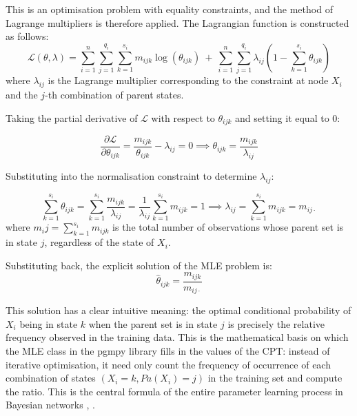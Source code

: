 \vspace{1em}
This is an optimisation problem with equality constraints, and the method of Lagrange multipliers is therefore applied. The Lagrangian function is constructed as follows:
\begin{equation}
    \mathcal{L}(\theta, \lambda) = \sum_{i=1}^{n}\sum_{j=1}^{q_i}\sum_{k=1}^{s_i} m_{ijk}\log(\theta_{ijk})\ +\ \sum_{i=1}^{n}\sum_{j=1}^{q_i} \lambda_{ij}\!\left(1 - \sum_{k=1}^{s_i}\theta_{ijk}\right)
\end{equation}
where $\lambda_{ij}$ is the Lagrange multiplier corresponding to the constraint at node $X_i$ and the $j$-th combination of parent states.

\vspace{1em}
\noindent
Taking the partial derivative of $\mathcal{L}$ with respect to $\theta_{ijk}$ and setting it equal to 0:

\begin{equation}
    \frac{\partial \mathcal{L}}{\partial \theta_{ijk}} = \frac{m_{ijk}}{\theta_{ijk}} - \lambda_{ij} = 0 \implies \theta_{ijk} = \frac{m_{ijk}}{\lambda_{ij}}
\end{equation}

\vspace{1em}
\noindent
Substituting into the normalisation constraint to determine $\lambda_{ij}$:

\begin{equation}
    \sum_{k=1}^{s_i}\theta_{ijk} = \sum_{k=1}^{s_i}\frac{m_{ijk}}{\lambda_{ij}} = \frac{1}{\lambda_{ij}}\sum_{k=1}^{s_i}m_{ijk} = 1 \implies \lambda_{ij} = \sum_{k=1}^{s_i}m_{ijk} = m_{ij\cdot}
\end{equation}
where $m_ij = \sum_{k=1}^{s_i}m_{ijk}$ is the total number of observations whose parent set is in state $j$, regardless of the state of $X_i$.

\vspace{1em}
\noindent
Substituting back, the explicit solution of the MLE problem is:
\begin{equation}
    \boxed{\hat{\theta}_{ijk} = \frac{m_{ijk}}{m_{ij\cdot}}}
\end{equation}

\vspace{1em}
This solution has a clear intuitive meaning: the optimal conditional probability of $X_i$ being in state $k$ when the parent set is in state $j$ is precisely the relative frequency observed in the training data. This is the mathematical basis on which the MLE class in the pgmpy library fills in the values of the CPT: instead of iterative optimisation, it need only count the frequency of occurrence of each combination of states $(X_i = k, Pa(X_i) = j)$ in the training set and compute the ratio. This is the central formula of the entire parameter learning process in Bayesian networks \cite{koller2009probabilistic}, \cite{liu2024credit}.

